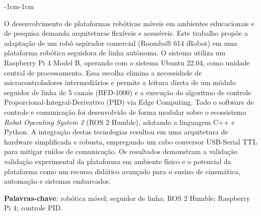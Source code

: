 \begin{adjustwidth}{-1cm}{-1cm}\vspace{\onelineskip}


\begin{resumo}

O desenvolvimento de plataformas robóticas móveis em ambientes educacionais e de pesquisa demanda arquiteturas flexíveis e acessíveis. Este trabalho propõe a adaptação de um robô aspirador comercial (Roomba® 614 iRobot) em uma plataforma robótica seguidora de linha autônoma. O sistema utiliza um Raspberry Pi 4 Model B, operando com o sistema Ubuntu 22.04, como unidade central de processamento. Essa escolha elimina a necessidade de microcontroladores intermediários e permite a leitura direta de um módulo seguidor de linha de 5 canais (BFD-1000) e a execução do algoritmo de controle Proporcional-Integral-Derivativo (PID) via Edge Computing. Todo o software de controle e comunicação foi desenvolvido de forma modular sobre o ecossistema \textit{Robot Operating System 2} (ROS 2 Humble), adotando a linguagem C++ e Python. A integração destas tecnologias resultou em uma arquitetura de hardware simplificada e robusta, empregando um cabo conversor USB-Serial TTL para mitigar ruídos de comunicação. Os resultados demonstram a validação validação experimental da plataforma em ambiente físico e o potencial da plataforma como um recurso didático avançado para o ensino de cinemática, automação e sistemas embarcados.

\vspace{\onelineskip}
\noindent

\textbf{Palavras-chave}: robótica móvel; seguidor de linha; ROS 2 Humble; Raspberry Pi 4; controle PID.

\end{resumo}
\end{adjustwidth}